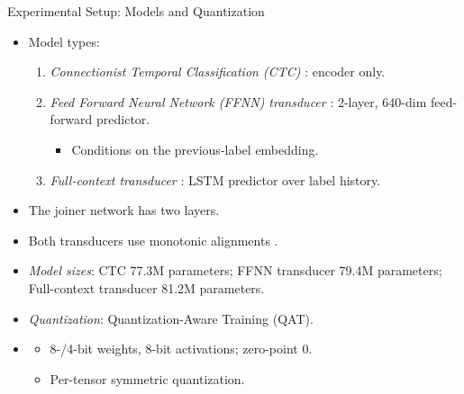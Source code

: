 \documentclass[xcolor=table,mathserif,9pt,usepdftitle=false]{beamer}    %
\newcommand{\ctcParameterMillions}{77.3M }
\newcommand{\ffnnParameterMillions}{79.4M }
\newcommand{\lstmParameterMillions}{81.2M }
\begin{document}
\begin{frame}{Experimental Setup: Models and Quantization}
  \begin{itemize}
    \setlength{\itemsep}{6pt}
    \item Model types:
          \begin{enumerate}
            \item \emph{Connectionist Temporal Classification (CTC)} \cite{graves2006connectionist}: encoder only.
            \item \emph{Feed Forward Neural Network (FFNN) transducer} \cite{graves2012sequence}: 2-layer, 640-dim feed-forward predictor.
                  \begin{itemize}
                    \item Conditions on the previous-label embedding.
                  \end{itemize}
            \item \emph{Full-context transducer} \cite{graves2012sequence}: LSTM predictor over label history.
          \end{enumerate}
    \item The joiner network has two layers.
    \item Both transducers use monotonic alignments \cite{tripathi2019monotonic}.
    \item \emph{Model sizes}:
          CTC \ctcParameterMillions  parameters; FFNN transducer \ffnnParameterMillions  parameters; Full-context transducer \lstmParameterMillions  parameters.
    \item \emph{Quantization}: Quantization-Aware Training (QAT).
    \item[] \begin{itemize}
            \item 8-/4-bit weights, 8-bit activations; zero-point 0.
            \item Per-tensor symmetric quantization.
          \end{itemize}
  \end{itemize}
\end{frame}
\end{document}

